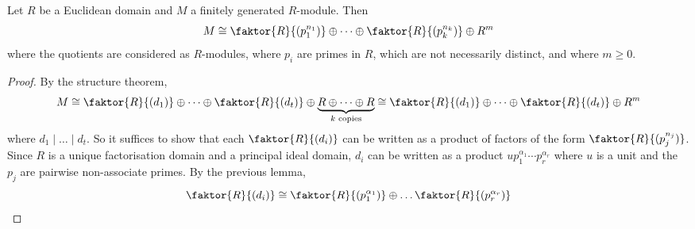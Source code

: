 \begin{lemma}
	Let \( R \) be a Euclidean domain and \( M \) a finitely generated \( R \)-module.
	Then
	\[
		M \cong \faktor{R}{(p_1^{n_1})} \oplus \dots \oplus \faktor{R}{(p_k^{n_k})} \oplus R^m
	\]
	where the quotients are considered as \( R \)-modules, where \( p_i \) are primes in \( R \), which are not necessarily distinct, and where \( m \geq 0 \).
\end{lemma}
\begin{proof}
	By the structure theorem,
	\[
		M \cong \faktor{R}{(d_1)} \oplus \dots \oplus \faktor{R}{(d_t)} \oplus \underbrace{R \oplus \dots \oplus R}_{k \text{ copies}} \cong \faktor{R}{(d_1)} \oplus \dots \oplus \faktor{R}{(d_t)} \oplus R^m
	\]
	where \( d_1 \mid \dots \mid d_t \).
	So it suffices to show that each \( \faktor{R}{(d_i)} \) can be written as a product of factors of the form \( \faktor{R}{(p_j^{n_j})} \).
	Since \( R \) is a unique factorisation domain and a principal ideal domain, \( d_i \) can be written as a product \( u p_1^{\alpha_1} \cdots p_r^{\alpha_r} \) where \( u \) is a unit and the \( p_j \) are pairwise non-associate primes.
	By the previous lemma,
	\[
		\faktor{R}{(d_i)} \cong \faktor{R}{(p_1^{\alpha_1})} \oplus \dots \faktor{R}{(p_r^{\alpha_r})}
	\]
\end{proof}

